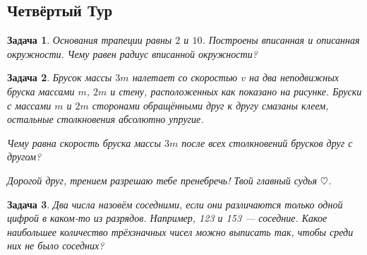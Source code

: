\documentclass[a4paper, 11pt]{article}
\theoremstyle{break}
\newtheorem{problem}{Задача}[subsection]
\begin{document}
\thispagestyle{empty}
\subsection*{Четвёртый Тур}

\begin{problem}
Основания трапеции равны $2$ и $10$. Построены вписанная и описанная окружности.
Чему равен радиус вписанной окружности?
\end{problem}

\begin{problem}
Брусок массы $3m$ налетает со скоростью $v$ на два неподвижных бруска массами $m$, $2m$
и стену, расположенных как показано на рисунке. Бруски с массами $m$ и $2m$
сторонами обращёнными друг к другу смазаны клеем, остальные столкновения абсолютно
упругие.

\begin{minipage}{0.8\textwidth}
\begin{center}
\end{center}
\end{minipage}


Чему равна скорость бруска массы $3m$ после всех столкновений брусков друг с другом?

Дорогой друг, трением разрешаю тебе пренебречь! Твой главный судья $\heartsuit$.
\end{problem}


\begin{problem}
Два числа назовём соседними, если они различаются только одной цифрой
в каком-то из разрядов. Например, 123 и 153 — соседние. Какое наибольшее количество
трёхзначных чисел можно выписать так, чтобы среди них не было соседних?
\end{problem}
\end{document}
